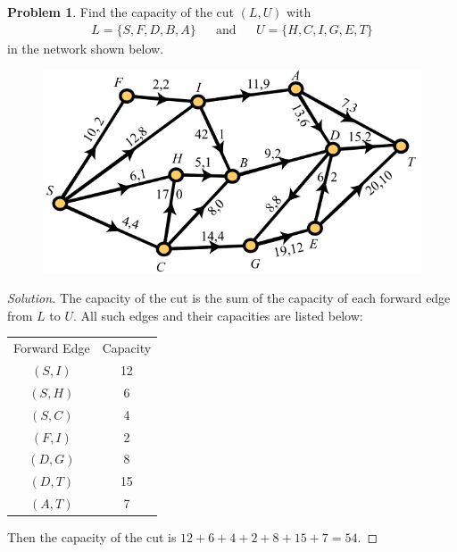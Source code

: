\documentclass[12pt]{article}
\newcounter{chapternumber}
\theoremstyle{definition}
\newtheorem{problem-internal}{Problem}[chapternumber]
\newenvironment{problem}{
  \medskip
  \begin{problem-internal}
}{
\end{problem-internal}
}
\newenvironment{solution}{
  \begin{proof}[Solution]
    \vspace{-8px}
    \setlength{\parskip}{4px}
    \setlength{\parindent}{0px}
}{
\end{proof}
}
\begin{document}
  \setcounter{problem-internal}{5}
  \begin{problem}
    Find the capacity of the cut \((L, U)\) with
    \begin{align*}
      L = \{S, F, D, B, A\} && \text{and} && U = \{H, C, I, G, E, T\}
    \end{align*}
    in the network shown below.

    \begin{figure}[H]
      \centering
      \includegraphics[scale=0.5]{media/aug_path.png}
    \end{figure}

  \end{problem}

  \begin{solution}
    The capacity of the cut is the sum of the capacity of each forward edge from \(L\) to \(U\). All such edges and their capacities are listed below:

    \begin{center}
      \begin{tabular}{c c}
        Forward Edge & Capacity \\
        \((S, I)\) & 12 \\
        \((S, H)\) &  6 \\
        \((S, C)\) &  4 \\
        \((F, I)\) &  2 \\
        \((D, G)\) &  8 \\
        \((D, T)\) & 15 \\
        \((A, T)\) &  7
      \end{tabular}
    \end{center}

    Then the capacity of the cut is \(12 + 6 + 4 + 2 + 8 + 15 + 7 = 54\).
  \end{solution}
\end{document}
